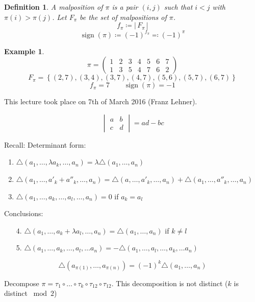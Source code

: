 \documentclass[a4paper,landscape,twocolumn]{article}
\newcommand\meta[3]{This #1 took place on #2 (#3).\par}
\newcommand\set[1]{\left\{#1\right\}}
\newcommand\card[1]{\left|\,#1\,\right|}
\newtheorem{defi}{Definition}
\newtheorem{ex}{Example}
\begin{document}
\begin{defi}
  \label{def-7.14}
  A \emph{malposition} of $\pi$ is a pair $(i,j)$ such that
  $i < j$ with $\pi(i) > \pi(j)$.
  Let $F_\pi$ be the set of malpositions of $\pi$.
  \[ f_{\pi} \coloneqq \card{F_\pi} \]
  \[ \operatorname{sign}(\pi) \coloneqq (-1)^{f_\pi} \eqqcolon (-1)^\pi \]
\end{defi}

\begin{ex}
  \label{example-7.15}
  \[
    \pi = \begin{pmatrix}
      1 & 2 & 3 & 4 & 5 & 6 & 7 \\
      1 & 3 & 5 & 4 & 7 & 6 & 2
    \end{pmatrix}
  \] \[
    F_\pi = \set{(2,7), (3,4), (3,7), (4,7), (5,6), (5,7), (6,7)}
  \]
  \[ f_\pi = 7 \qquad \operatorname{sign}(\pi) = -1 \]
\end{ex}

\meta{lecture}{7th of March 2016}{Franz Lehner}

\[
  \begin{vmatrix}
    a & b \\
    c & d
  \end{vmatrix}
  = ad - bc
\]

Recall: Determinant form:
\begin{enumerate}
  \item $\triangle(a_1, \ldots, \lambda a_k, \ldots, a_n) = \lambda \triangle (a_1, \ldots, a_n)$
  \item $\triangle(a_1, \ldots, a'_k + a''_k, \ldots, a_n) = \triangle(a, \ldots, a'_k, \ldots, a_n) + \triangle(a_1, \ldots, a''_k, \ldots, a_n)$
  \item $\triangle(a_1, \ldots, a_k, \ldots, a_l, \ldots, a_n) = 0$ if $a_k = a_l$
\end{enumerate}
Conclusions:
\begin{enumerate}
  \item[4.] $\triangle (a_1, \ldots, a_k + \lambda a_l, \ldots, a_n) = \triangle (a_1, \ldots, a_n)$ if $k \neq l$
  \item[5.] $\triangle (a_1, \ldots, a_k, \ldots, a_l, \ldots a_n) = -\triangle (a_1, \ldots, a_l, \ldots, a_k, \ldots a_n)$
\end{enumerate}

\[ \triangle (a_{\pi(1)}, \ldots, a_{\pi(n)}) = (-1)^k \triangle (a_1, \ldots, a_n) \]

Decompose $\pi = \tau_1 \circ \ldots \circ \tau_k \circ \tau_{12} \circ \tau_{12}$.
This decomposition is not distinct ($k$ is distinct $\bmod{2}$)
\end{document}
